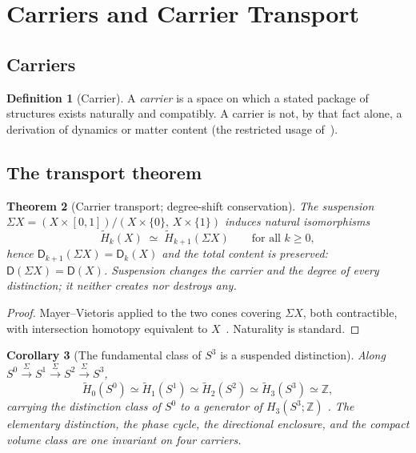 \documentclass[11pt,a4paper]{article}
\newtheorem{theorem}{Theorem}[section]
\newtheorem{corollary}[theorem]{Corollary}
\theoremstyle{definition}
\newtheorem{definition}[theorem]{Definition}
\theoremstyle{remark}
\newcommand{\Szero}{S^{0}}
\newcommand{\Sone}{S^{1}}
\newcommand{\Stwo}{S^{2}}
\newcommand{\Sthree}{S^{3}}
\newcommand{\Z}{\mathbb{Z}}
\newcommand{\rH}{\widetilde H}
\newcommand{\Dd}{\mathsf{D}}
\begin{document}
\section{Carriers and Carrier Transport}
\label{sec:carriers}

\subsection{Carriers}

\begin{definition}[Carrier]
A \emph{carrier} is a space on which a stated package of structures exists naturally and
compatibly.  A carrier is not, by that fact alone, a derivation of dynamics or matter content
(the restricted usage of~\cite{PB2026susp}).
\end{definition}

\subsection{The transport theorem}

\begin{theorem}[Carrier transport; degree-shift conservation]
\label{thm:transport}
The suspension $\Sigma X=(X\times[0,1])/(X\times\{0\},\,X\times\{1\})$ induces natural
isomorphisms
\begin{equation}
\rH_{k}(X)\;\simeq\;\rH_{k+1}(\Sigma X)\qquad\text{for all }k\ge0,
\end{equation}
hence $\Dd_{k+1}(\Sigma X)=\Dd_{k}(X)$ and the total content is preserved:
$\Dd(\Sigma X)=\Dd(X)$.  Suspension changes the carrier and the degree of every distinction;
it neither creates nor destroys any.
\end{theorem}

\begin{proof}
Mayer--Vietoris applied to the two cones covering $\Sigma X$, both contractible, with
intersection homotopy equivalent to $X$~\cite{Hatcher2002}.  Naturality is standard.
\end{proof}

\begin{corollary}[The fundamental class of $\Sthree$ is a suspended distinction]
\label{cor:s3class}
Along $\Szero\xrightarrow{\Sigma}\Sone\xrightarrow{\Sigma}\Stwo\xrightarrow{\Sigma}\Sthree$,
\begin{equation}
\rH_{0}(\Szero)\simeq\rH_{1}(\Sone)\simeq\rH_{2}(\Stwo)\simeq\rH_{3}(\Sthree)\simeq\Z ,
\end{equation}
carrying the distinction class of $\Szero$ to a generator of $H_{3}(\Sthree;\Z)$
\cite{PB2026susp}.  The elementary distinction, the phase cycle, the directional enclosure, and
the compact volume class are one invariant on four carriers.
\end{corollary}
\end{document}
